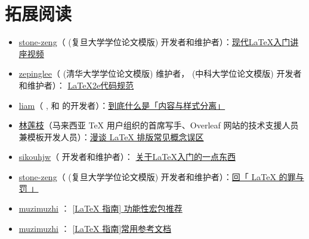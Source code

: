 
\section{拓展阅读} \label{sec:拓展阅读}

\begin{itemize}
  \item \href{https://github.com/stone-zeng}{stone-zeng}（  (复旦大学学位论文模版) 开发者和维护者）：\href{https://www.bilibili.com/video/BV1RE411W7FS?p=1}{现代LaTeX入门讲座视频} 
  \item \href{https://github.com/zepinglee}{zepinglee}（  (清华大学学位论文模版) 维护者， (中科大学位论文模版) 开发者和维护者）： \href{https://gitee.com/zepinglee/latex2e-style-guide}{LaTeX2e代码规范} 
  \item \href{https://liam.page/}{liam}（  ,  和  的开发者）：\href{https://liam.page/2019/03/18/separation-of-content-and-presentation/}{到底什么是「内容与样式分离」}
  \item \href{http://liantze.penguinattack.org/index.html}{林莲枝}（马来西亚 TeX 用户组织的首席写手、Overleaf 网站的技术支援人员兼模板开发人员）：\href{https://www.bilibili.com/video/BV1r4411o7KJ?spm_id_from=333.999.0.0}{漫谈 LaTeX 排版常见概念误区}
  \item \href{https://github.com/sikouhjw}{sikouhjw}（  开发者和维护者）： \href{https://sikouhjw.github.io/2020/03/08/2020-03-08-Learn-LaTeX}{关于LaTeX入门的一点东西} 
  \item \href{https://github.com/stone-zeng}{stone-zeng}（  (复旦大学学位论文模版) 开发者和维护者）：\href{https://stone-zeng.github.io/2019-07-23-latex-crime-and-punishment/}{回「 LaTeX 的罪与罚 」}
  \item \href{https://zhuanlan.zhihu.com/typography-and-latex/}{muzimuzhi} ： \href{https://zhuanlan.zhihu.com/p/43981639}{[LaTeX 指南] 功能性宏包推荐}
  \item \href{https://zhuanlan.zhihu.com/typography-and-latex/}{muzimuzhi} ： \href{https://zhuanlan.zhihu.com/p/43938945}{[LaTeX 指南]常用参考文档}
\end{itemize}